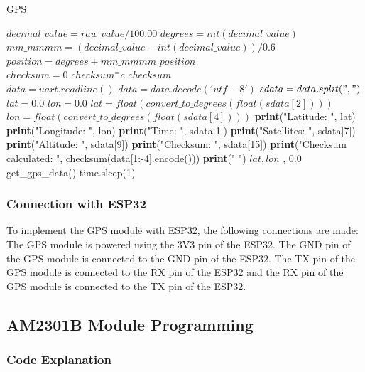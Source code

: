 \documentclass{report}
\begin{document}
\begin{algorithm}
\caption{GPS }
\begin{algorithmic}[1]
\State $decimal\_value = raw\_value/100.00$
\State $degrees = int(decimal\_value)$
\State $mm\_mmmm = (decimal\_value - int(decimal\_value))/0.6$
\State $position = degrees + mm\_mmmm$
\State %
\State \Return $ position$ 
\EndProcedure
\\
\State $checksum = 0$
\State $checksum ^= c$
\EndFor
\State \Return $checksum$
\EndProcedure
\\
\State $data = uart.readline()$
\State $data = data.decode('utf-8')$
\State $sdata = data.split(",")$
\State $lat = 0.0$
\State $lon = 0.0$
\Else
\State $lat = float(convert\_to\_degrees(float(sdata[2])))$
\State $lon = float(convert\_to\_degrees(float(sdata[4])))$
\EndIf
\State \textbf{print}("Latitude: ", lat)
\State \textbf{print}("Longitude: ", lon)
\State \textbf{print}("Time: ", sdata[1])
\State \textbf{print}("Satellites: ", sdata[7])
\State \textbf{print}("Altitude: ", sdata[9])
\State \textbf{print}("Checksum: ", sdata[15])
\State \textbf{print}("Checksum calculated: ", checksum(data[1:-4].encode()))
\State \textbf{print}("
")
\State \Return $lat, lon$
\EndIf
\Else
\State {}, 0.0
\EndIf
\EndProcedure
\\
\State get\_gps\_data()
\State time.sleep(1)
\EndWhile
\end{algorithmic}
\end{algorithm}


\subsubsection{Connection with ESP32}
To implement the GPS module with ESP32, the following connections are made:
The GPS module is powered using the 3V3 pin of the ESP32. The GND pin of the GPS module is connected to the GND pin of the ESP32. The TX pin of the GPS module is connected to the RX pin of the ESP32 and the RX pin of the GPS module is connected to the TX pin of the ESP32. 


\subsection{AM2301B Module Programming}
\subsubsection{Code Explanation}
\end{document}
